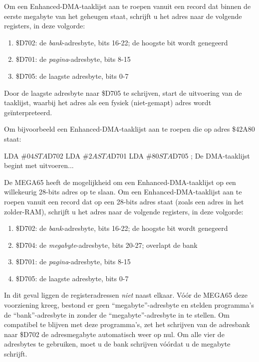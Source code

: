 Om een Enhanced-DMA-taaklijst aan te roepen vanuit een record dat binnen de eerste megabyte van het geheugen staat, schrijft u het adres naar de volgende registers, in deze volgorde:

\begin{enumerate}
\item \$D702: de \emph{bank}-adresbyte, bits 16-22; de hoogste bit wordt genegeerd\item \$D701: de \emph{pagina}-adresbyte, bits 8-15\item \$D705: de laagste adresbyte, bits 0-7
\end{enumerate}

Door de laagste adresbyte naar \$D705 te schrijven, start de uitvoering van de taaklijst, waarbij het adres als een fysiek (niet-gemapt) adres wordt geïnterpreteerd.

Om bijvoorbeeld een Enhanced-DMA-taaklijst aan te roepen die op adres \$42A80 staat:

\begin{asmcodesmall}
LDA #$04
STA $D702
LDA #$2A
STA $D701
LDA #$80
STA $D705    ; De DMA-taaklijst begint met uitvoeren...
\end{asmcodesmall}

De MEGA65 heeft de mogelijkheid om een Enhanced-DMA-taaklijst op een willekeurig 28-bits adres op te slaan. Om een Enhanced-DMA-taaklijst aan te roepen vanuit een record dat op een 28-bits adres staat (zoals een adres in het zolder-RAM), schrijft u het adres naar de volgende registers, in deze volgorde:

\begin{enumerate}
\item \$D702: de \emph{bank}-adresbyte, bits 16-22; de hoogste bit wordt genegeerd\item \$D704: de \emph{megabyte}-adresbyte, bits 20-27; overlapt de bank\item \$D701: de \emph{pagina}-adresbyte, bits 8-15\item \$D705: de laagste adresbyte, bits 0-7
\end{enumerate}

In dit geval liggen de registeradressen \emph{niet} naast elkaar. Vóór de MEGA65 deze voorziening kreeg, bestond er geen ``megabyte''-adresbyte en stelden programma's de ``bank''-adresbyte in zonder de ``megabyte''-adresbyte in te stellen. Om compatibel te blijven met deze programma's, zet het schrijven van de adresbank naar \$D702 de adresmegabyte automatisch weer op nul. Om alle vier de adresbytes te gebruiken, moet u de bank schrijven vóórdat u de megabyte schrijft.

